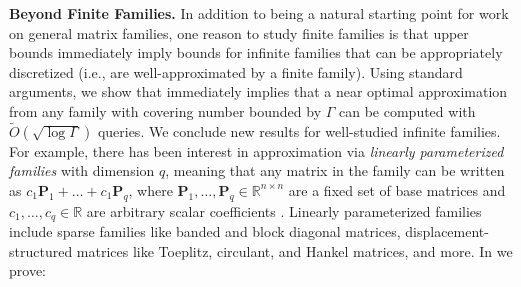 \documentclass{article}[11pt]
\theoremstyle{definition}
\newcommand{\bv}[1]{\boldsymbol{\mathbf{#1}}}
\newcommand{\R}{\mathbb{R}}
\begin{document}
\smallskip\noindent \textbf{Beyond Finite Families.} 
In addition to being a natural starting point for work on general matrix families, one reason to study finite families is that upper bounds immediately imply bounds for infinite families that can be appropriately discretized (i.e., are well-approximated by a finite family). Using standard arguments, we show that  immediately implies that a near optimal approximation from any family with covering number bounded by $\Gamma$ can be computed with $\tilde{O}(\sqrt{\log \Gamma})$ queries. We conclude new results for well-studied infinite families. For example, there has been interest in approximation via \emph{linearly parameterized families} with dimension $q$, meaning that any matrix in the family can be written as $c_1 \bv{P}_1 + \ldots + c_1 \bv{P}_q$, where $\bv{P}_1, \ldots, \bv{P}_q \in \R^{n \times n}$ are a fixed set of base matrices and $c_1, \ldots, c_q \in \R$ are arbitrary scalar coefficients \cite{EldarLiMusco:2020,HalikiasTownsend:2023,Otto:2023}. Linearly parameterized families include sparse families like banded and block diagonal matrices, displacement-structured matrices like Toeplitz, circulant, and Hankel matrices, and more. In  we prove:
\end{document}
